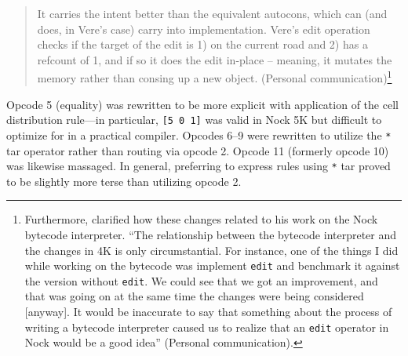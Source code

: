 \documentclass[twoside]{article}
\begin{document}
\begin{quote}
It carries the intent better than the equivalent autocons, which can (and does, in Vere's case) carry into implementation.  Vere's edit operation checks if the target of the edit is 1) on the current road and 2) has a refcount of 1, and if so it does the edit in-place -- meaning, it mutates the memory rather than consing up a new object.  (Personal communication)\footnote{Furthermore,  clarified how these changes related to his work on the Nock bytecode interpreter.  ``The relationship between the bytecode interpreter and the changes in 4K is only circumstantial. For instance, one of the things I did while working on the bytecode was implement \texttt{edit} and benchmark it against the version without \texttt{edit}.  We could see that we got an improvement, and that was going on at the same time the changes were being considered [anyway].  It would be inaccurate to say that something about the process of writing a bytecode interpreter caused us to realize that an \texttt{edit} operator in Nock would be a good idea'' (Personal communication).}
\end{quote}

Opcode 5 (equality) was rewritten to be more explicit with application of the cell distribution rule---in particular, \texttt{[5 0 1]} was valid in Nock 5K but difficult to optimize for in a practical compiler.  Opcodes 6–9 were rewritten to utilize the \texttt{*} tar operator rather than routing via opcode 2.  Opcode 11 (formerly opcode 10) was likewise massaged.  In general, preferring to express rules using \texttt{*} tar proved to be slightly more terse than utilizing opcode 2.
\end{document}
